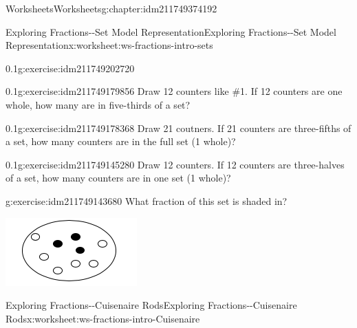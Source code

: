\documentclass[twoside,11pt,]{book}
\begin{document}
\begin{chapterptx}{Worksheets}{}{Worksheets}{}{}{g:chapter:idm211749374192}
\begin{worksheet-section-numberless}{Exploring Fractions-{}-{}Set Model Representation}{}{Exploring Fractions-{}-{}Set Model Representation}{}{}{x:worksheet:ws-fractions-intro-sets}
\begin{divisionexercise}{1}{}{0.1}{g:exercise:idm211749202720}
\begin{sidebyside}{1}{0.35}{0.35}{0}
\begin{sbspanel}{0.3}
\end{sbspanel}%
\end{sidebyside}%
%
\end{divisionexercise}%
\begin{divisionexercise}{2}{}{0.1}{g:exercise:idm211749179856}%
Draw 12 counters like \#1. If 12 counters are one whole, how many are in five-thirds of a set?%
\end{divisionexercise}%
\begin{divisionexercise}{3}{}{0.1}{g:exercise:idm211749178368}%
Draw 21 coutners. If 21 counters are three-fifths of a set, how many counters are in the full set (1 whole)?%
\end{divisionexercise}%
\begin{divisionexercise}{4}{}{0.1}{g:exercise:idm211749145280}%
Draw 12 counters. If 12 counters are three-halves of a set, how many counters are in one set (1 whole)?%
\end{divisionexercise}%
\begin{divisionexercise}{5}{}{}{g:exercise:idm211749143680}%
What fraction of this set is shaded in? \begin{sidebyside}{1}{0.35}{0.35}{0}%
\begin{sbspanel}{0.3}%
\includegraphics[width=1\linewidth]{images/counters-one-third.png}
\end{sbspanel}%
\end{sidebyside}%
%
\end{divisionexercise}%
\end{worksheet-section-numberless}
\restoregeometry
%
%
\typeout{************************************************}
\typeout{************************************************}
%
\begin{worksheet-section-numberless}{Exploring Fractions-{}-{}Cuisenaire Rods}{}{Exploring Fractions-{}-{}Cuisenaire Rods}{}{}{x:worksheet:ws-fractions-intro-Cuisenaire}

\end{worksheet-section-numberless}
\end{chapterptx}
\end{document}
